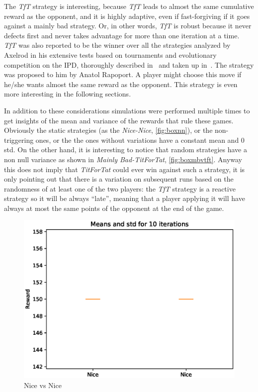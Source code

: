 \documentclass[journal,a4paper,10pt,twoside]{IEEEtran} %
\begin{document}
The \textit{TfT} strategy is interesting, because \textit{TfT} leads to almost the same cumulative reward as the opponent, and it is highly adaptive, even if fast-forgiving if it goes against a mainly bad strategy.
Or, in other words, \textit{TfT} is robust because it never defects first and never takes advantage for more than one iteration at a time.~\cite{fogelEvolvingBehaviors}
\textit{TfT} was also reported to be the winner over all the strategies analyzed by Axelrod in his extensive tests based on tournaments and evolutionary competition on the IPD, thoroughly described in~\cite{axelrod1981evolution,axelrod1984evolution} and taken up in~\cite{mathieu2017}.
The strategy was proposed to him by Anatol Rapoport.
A player might choose this move if he/she wants almost the same reward as the opponent. This strategy is even more interesting in the following sections.

In addition to these considerations simulations were performed multiple times to get insights of the mean and variance of the rewards that rule these games. Obviously the static strategies (as the \textit{Nice-Nice}, \autoref{fig:boxnn}), or the non-triggering ones, or the the ones without variations have a constant mean and $0$ std. On the other hand, it is interesting to notice that random strategies have a non null variance as shown in \textit{Mainly Bad-TitForTat}, \autoref{fig:boxmbvtft}. Anyway this does not imply that \textit{TitForTat} could ever win against such a strategy, it is only pointing out that there is a variation on subsequent runs based on the randomness of at least one of the two players: the \textit{TfT} strategy is a reactive strategy so it will be always ``late'', meaning that a player applying it will have always at most the same points of the opponent at the end of the game.

\begin{figure}[!ht]
    \centering
    \includegraphics[width=1\columnwidth]{../img/ipd2p/ipd2p-boxplot-Nice-Nice}
    \caption{Nice vs Nice}
    \label{fig:boxnn}
\end{figure}
\end{document}
